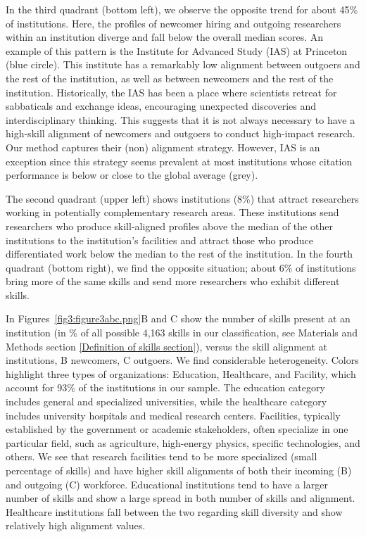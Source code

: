 \documentclass[draft,final]{vutinfth} %
\begin{document}
In the third quadrant (bottom left), we observe the opposite trend for about 45\% of institutions. Here, the profiles of newcomer hiring and outgoing researchers within an institution diverge and fall below the overall median scores. An example of this pattern is the Institute for Advanced Study (IAS) at Princeton (blue circle). This institute has a remarkably low alignment between outgoers and the rest of the institution, as well as between newcomers and the rest of the institution. Historically, the IAS has been a place where scientists retreat for sabbaticals and exchange ideas, encouraging unexpected discoveries and interdisciplinary thinking. This suggests that it is not always necessary to have a high-skill alignment of newcomers and outgoers to conduct high-impact research. Our method captures their (non) alignment strategy. However, IAS is an exception since this strategy seems prevalent at most institutions whose citation performance is below or close to the global average (grey).

The second quadrant (upper left) shows institutions (8\%) that attract researchers working in potentially complementary research areas. These institutions send researchers who produce skill-aligned profiles above the median of the other institutions to the institution's facilities and attract those who produce differentiated work below the median to the rest of the institution. In the fourth quadrant (bottom right), we find the opposite situation; about 6\% of institutions bring more of the same skills and send more researchers who exhibit different skills.
 
In Figures~\ref{fig3:figure3abc.png}B and C show the number of skills present at an institution (in \% of all possible 4,163 skills in our classification, see Materials and Methods section \ref{Definition of skills section}), versus the skill alignment at institutions, B newcomers, C outgoers. We find considerable heterogeneity. Colors highlight three types of organizations: Education, Healthcare, and Facility, which account for 93\% of the institutions in our sample. The education category includes general and specialized universities, while the healthcare category includes university hospitals and medical research centers. Facilities, typically  established by the government or academic stakeholders, often specialize in one particular field, such as agriculture, high-energy physics, specific technologies, and others. We see that research facilities tend to be more specialized (small percentage of skills) and have higher skill alignments of both their incoming (B) and outgoing (C) workforce. Educational institutions tend to have a larger number of skills and show a large spread in both number of skills and alignment. Healthcare institutions fall between the two regarding skill diversity and show relatively high alignment values. 
\end{document}
